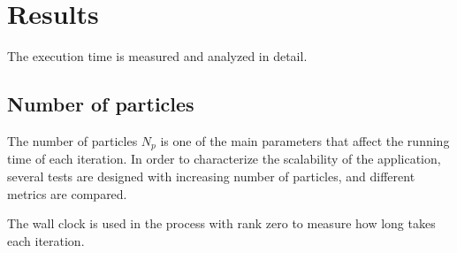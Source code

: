 \chapter{Results}

The execution time is measured and analyzed in detail.

\section{Number of particles}

The number of particles $N_p$ is one of the main parameters that affect the
running time of each iteration. In order to characterize the scalability of the
application, several tests are designed with increasing number of particles, and
different metrics are compared.

The wall clock is used in the process with rank zero to measure how long takes
each iteration.
